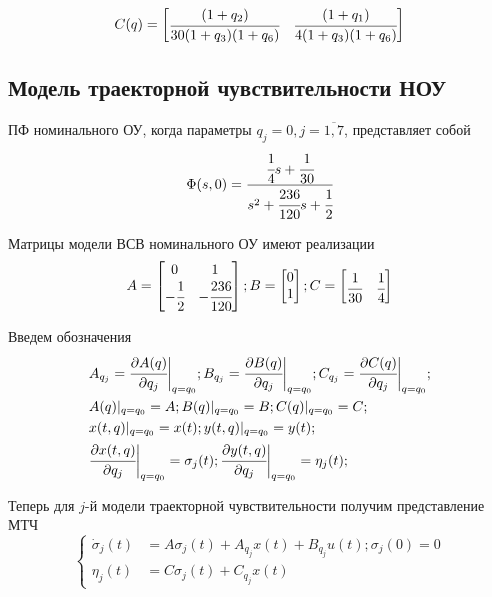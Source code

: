 \begin{equation}\label{Cq}
	C(q) =
	\begin{bmatrix}
	\cfrac{(1 + q_2)}{30(1+q_3)(1+q_6)} & \cfrac{(1 + q_1)}{4(1+q_3)(1+q_6)} 
	\end{bmatrix}
\end{equation}

\subsection{Модель траекторной чувствительности НОУ}

ПФ номинального ОУ, когда параметры $q_{j} = 0, j = \overline{1,7}$, представляет собой
\begin{equation}
	\Phi(s, 0) = \cfrac{\cfrac{1}{4} s + \cfrac{1}{30}}{s^2 + \cfrac{236}{120} s + \cfrac{1}{2}} 
\end{equation}

Матрицы модели ВСВ номинального ОУ имеют реализации
\begin{align*}
A =
\begin{bmatrix}
0 & 1 \\
- \cfrac{1}{2} & - \cfrac{236}{120}
\end{bmatrix};
B =
\begin{bmatrix}
0\\
1
\end{bmatrix};
C =
\begin{bmatrix}
\cfrac{1}{30} & \cfrac{1}{4}
\end{bmatrix}
\end{align*}

Введем обозначения
\begin{align*}
	&A_{q_j} = \cfrac{\partial{A(q)}}{\partial{q_j}} \bigg|_{q=q_0};
	B_{q_j} = \cfrac{\partial{B(q)}}{\partial{q_j}} \bigg|_{q=q_0};
	C_{q_j} = \cfrac{\partial{C(q)}}{\partial{q_j}} \bigg|_{q=q_0};\\
	&A(q)|_{q=q_0} = A;
	B(q)|_{q=q_0} = B;
	C(q)|_{q=q_0} = C;\\
	&x(t,q)|_{q=q_0} = x(t);
	y(t,q)|_{q=q_0} = y(t);\\
	&\cfrac{\partial{x(t,q)}}{\partial{q_j}} \bigg|_{q=q_0} = \sigma_j(t);
	\cfrac{\partial{y(t,q)}}{\partial{q_j}} \bigg|_{q=q_0} = \eta_j(t);
\end{align*}

Теперь для $j$-й модели траекторной чувствительности получим представление МТЧ
\begin{equation}\label{eq_mts}
	\begin{cases}
		\dot \sigma_j(t) &= A \sigma_j(t) + A_{q_j} x(t) + B_{q_j} u(t); 
		\sigma_j (0) = 0\\
		\eta_j (t) &= C \sigma_j (t) + C_{q_j} x(t)
	\end{cases}
\end{equation}

